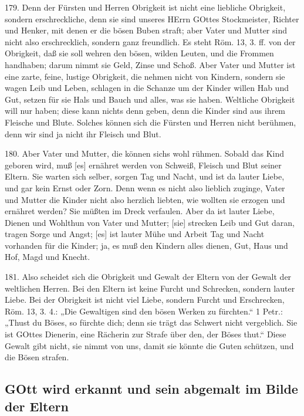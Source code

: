 179. Denn der Fürsten und Herren Obrigkeit ist nicht eine liebliche Obrigkeit, sondern erschreckliche, denn sie sind unseres HErrn GOttes Stockmeister, Richter und Henker, mit denen er die bösen Buben straft; aber Vater und Mutter sind nicht also erschrecklich, sondern ganz freundlich. Es steht Röm. 13, 3. ff. von der Obrigkeit, daß sie soll wehren den bösen, wilden Leuten, und die Frommen handhaben; darum nimmt sie Geld, Zinse und Schoß. Aber Vater und Mutter ist eine zarte, feine, lustige Obrigkeit, die nehmen nicht von Kindern, sondern sie wagen Leib und Leben, schlagen in die Schanze um der Kinder willen Hab und Gut, setzen für sie Hals und Bauch und alles, was sie haben. Weltliche Obrigkeit will nur haben; diese kann nichts denn geben, denn die Kinder sind aus ihrem Fleische und Blute. Solches können sich die Fürsten und Herren nicht berühmen, denn wir sind ja nicht ihr Fleisch und Blut.

180. Aber Vater und Mutter, die können sichs wohl rühmen. Sobald das Kind geboren wird, muß [es] ernähret werden von Schweiß, Fleisch und Blut seiner Eltern. Sie warten sich selber, sorgen Tag und Nacht, und ist da lauter Liebe, und gar kein Ernst oder Zorn. Denn wenn es nicht also lieblich zuginge, Vater und Mutter die Kinder nicht also herzlich liebten, wie wollten sie erzogen und ernähret werden? Sie müßten im Dreck verfaulen. Aber da ist lauter Liebe, Dienen und Wohlthun von Vater und Mutter; [sie] strecken Leib und Gut daran, tragen Sorge und Angst; [es] ist lauter Mühe und Arbeit Tag und Nacht vorhanden für die Kinder; ja, es muß den Kindern alles dienen, Gut, Haus und Hof, Magd und Knecht.

181. Also scheidet sich die Obrigkeit und Gewalt der Eltern von der Gewalt der weltlichen Herren. Bei den Eltern ist keine Furcht und Schrecken, sondern lauter Liebe. Bei der Obrigkeit ist nicht viel Liebe, sondern Furcht und Erschrecken, Röm. 13, 3. 4.: „Die Gewaltigen sind den bösen Werken zu fürchten.“ 1 Petr.: „Thust du Böses, so fürchte dich; denn sie trägt das Schwert nicht vergeblich. Sie ist GOttes Dienerin, eine Rächerin zur Strafe über den, der Böses thut.“ Diese Gewalt gibt nicht, sie nimmt von uns, damit sie könnte die Guten schützen, und die Bösen strafen.

\subsection{GOtt wird erkannt und sein abgemalt im Bilde der Eltern}

